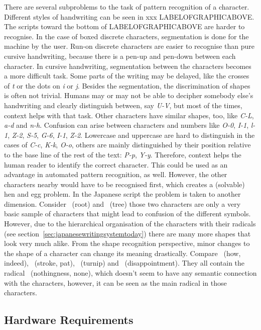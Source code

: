 There are several subproblems to the task of pattern recognition of a character.
Different styles of handwriting can be seen in xxx LABELOFGRAPHICABOVE. 
The scripts toward the bottom of LABELOFGRAPHICABOVE are harder to recognise. 
In the case of boxed discrete characters, segmentation is done for the 
machine by the user. Run-on discrete characters are easier to recognise 
than pure cursive handwriting, because there is a pen-up and 
pen-down between each character. In cursive handwriting, segmentation 
between the characters becomes a more difficult task. Some parts of the writing
may be delayed, like the crosses of \emph{t} or the dots on \emph{i} or \emph{j}.
Besides the segmentation, the discrimination of shapes is often not trivial.
Humans may or may not be able to decipher somebody else's handwriting and clearly
distinguish between, say \emph{U-V}, but most of the times, context helps with 
that task. Other characters have similar shapes, too, like \emph{C-L}, \emph{a-d}
and \emph{n-h}. Confusion can arise between characters and numbers like 
\emph{O-0}, \emph{I-1}, \emph{l-1}, \emph{Z-2}, \emph{S-5}, \emph{G-6}, 
\emph{I-1}, \emph{Z-2}. Lowercase and uppercase are hard to distinguish in the
cases of \emph{C-c}, \emph{K-k}, \emph{O-o}, others are mainly distinguished 
by their position relative to the base line of the rest of the text: 
\emph{P-p}, \emph{Y-y}. Therefore, context helps the human reader to identify
the correct character. This could be used as an advantage in automated pattern
recognition, as well. However, the other characters nearby would have to be
recognised first, which creates a (solvable) hen and egg problem.
In the Japanese script the problem is taken to another dimension. 
Consider ~(root) and ~(tree) those two characters are only a 
very basic sample of characters that might lead to confusion of the different 
symbols. However, due to the hierarchical organisation of the characters 
with their radicals
(see section~\ref{sec:japanesewritingsystemtoday}) there are many more shapes 
that look very much alike. From the shape recognition perspective, 
minor changes to the shape of a character can change its meaning drastically.
Compare ~(how, indeed), ~(stroke, pat), ~(turnip) and
~(disappointment). They all contain the radical 
~(nothingness, none), which doesn't seem to have any semantic connection
with the characters, however, it can be seen as the main radical in those 
characters.

\subsection{Hardware Requirements}
\label{sec:hardwarerequirements}

